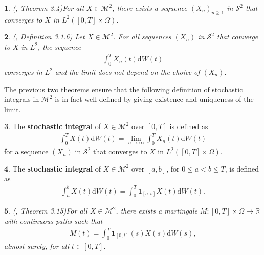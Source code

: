 \documentclass[english]{article}
\numberwithin{equation}{section}
\numberwithin{figure}{section}
\theoremstyle{bolddescit}
\newtheorem{theorem}{\protect\theoremname}[section]
\theoremstyle{definition}
\newtheorem{definition}[theorem]{\protect\definitionname}
\theoremstyle{definition}
\theoremstyle{plain}
\theoremstyle{plain}
\theoremstyle{bolddesc}
\theoremstyle{plain}
\newtheorem{proposition}[theorem]{\protect\propositionname}
\theoremstyle{remark}
\providecommand{\definitionname}{Definition}
\providecommand{\propositionname}{Proposition}
\providecommand{\theoremname}{Theorem}
\begin{document}
\begin{theorem}
  (\cite{capinski_stochastic_2012}, Theorem 3.4)\label{thm:s2-m2-conv}
  For all $X \in \mathcal{M}^2$, there exists a sequence $(X_n)_{n \ge 1}$ in $\mathcal{S}^2$ that converges to $X$ in $L^2([0,T] \times \Omega)$.
\end{theorem}

\begin{theorem}
  (\cite{oksendal_stochastic_2003}, Definition 3.1.6)
  Let $X \in \mathcal{M}^2$. For all sequences $(X_n)$ in $\mathcal{S}^2$ that converge to $X$ in $L^2$, the sequence
  \begin{align*}
    \int_0^T X_n(t) \mathrm{d}W(t)
  \end{align*}
  converges in $L^2$ and the limit does not depend on the choice of $(X_n)$.
\end{theorem}

The previous two theorems ensure that the following definition of stochastic integrals in $\mathcal{M}^2$ is in fact well-defined by giving existence and uniqueness of the limit.

\begin{definition}
  The \textbf{stochastic integral} of $X \in \mathcal{M}^2$ over $[0,T]$ is defined as
  \begin{align*}
    \int_0^T X(t) \mathrm{d}W(t) = \lim_{n \to \infty} \int_0^T X_n(t) \mathrm{d}W(t)
  \end{align*}
  for a sequence $(X_n)$ in $\mathcal{S}^2$ that converges to $X$ in $L^2([0,T] \times \Omega)$.
\end{definition}

\begin{definition}
  The \textbf{stochastic integral} of $X \in \mathcal{M}^2$ over $[a,b]$, for $0 \le a < b \le T$, is defined as
  \begin{align*}
    \int_a^b X(t) \mathrm{d}W(t)
    = \int_0^T \mathbf{1}_{[a,b]} X(t) \mathrm{d}W(t).
  \end{align*}
\end{definition}

\begin{proposition}(\cite{capinski_stochastic_2012}, Theorem 3.15)\label{prop:stochastic-integral-martingale}
  For all $X \in \mathcal{M}^2$, there exists a martingale $M : [0,T] \times \Omega \to \mathbb{R}$ with continuous paths such that
  \begin{align*}
    M(t) = \int_0^T \mathbf{1}_{[0,t]}(s) X(s) \mathrm{d}W(s),
  \end{align*}
  almost surely, for all $t \in [0,T]$.
\end{proposition}
\end{document}
